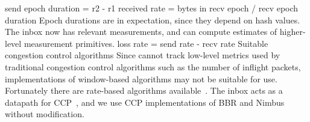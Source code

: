 \begin{outline}
            \4 send epoch duration = r2 - r1
            \4 received rate = bytes in recv epoch / recv epoch duration
        \3 Epoch durations are in expectation, since they depend on hash values.
    \2 The inbox now has relevant measurements, and can compute estimates of higher-level measurement primitives.
        \3 \eg loss rate = send rate - recv rate
\1 Suitable congestion control algorithms
    \2 Since \name cannot track low-level metrics used by traditional congestion control algorithms such as the number of inflight packets, implementations of window-based algorithms may not be suitable for use.
    \2 Fortunately there are rate-based algorithms available~\cite{bbr, nimbus}.
    \2 The inbox acts as a datapath for CCP~\cite{ccp}, and we use CCP implementations of BBR and Nimbus without modification.
\end{outline}